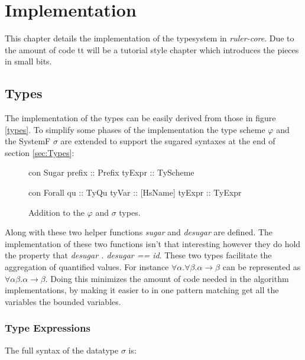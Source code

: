 \chapter{Implementation}
This chapter details the implementation of the typesystem in \emph{ruler-core}. Due to the amount of code tt will be a tutorial style chapter which introduces the pieces in small bits.
\section{Types}
The implementation of the types can be easily derived from those in figure \ref{types}. To simplify some phases of the implementation the type scheme $\varphi$ and the SystemF $\sigma$ are extended to support the sugared syntaxes at the end of section \ref{sec:Types}:

\begin{figure}
\begin{minipage}[t]{0.5\linewidth}
\begin{code}
  con Sugar
     prefix  :: Prefix
     tyExpr  :: TyScheme
\end{code}
\end{minipage}
\begin{minipage}[t]{0.5\linewidth}
\begin{code}
  con Forall
    qu        :: TyQu
    tyVar     :: [HsName]
    tyExpr    :: TyExpr 
\end{code} 
\end{minipage}
\caption{Addition to the $\varphi$ and $\sigma$ types.}
\label{abs:fig:types}
\end{figure}

Along with these two helper functions \emph{sugar} and \emph{desugar} are defined. The implementation of these two functions isn't that interesting however they do hold the property that \emph{desugar . desugar == id}. These two types facilitate the aggregation of quantified values. For instance $\forall \alpha . \forall \beta. \alpha \rightarrow \beta$ can be represented as $\forall \alpha \beta . \alpha \rightarrow \beta$. Doing this minimizes the amount of code needed in the algorithm implementations, by making it easier to in one pattern matching get all the variables the bounded variables.
\subsection{Type Expressions}
The full syntax of the datatype $\sigma$ is:


